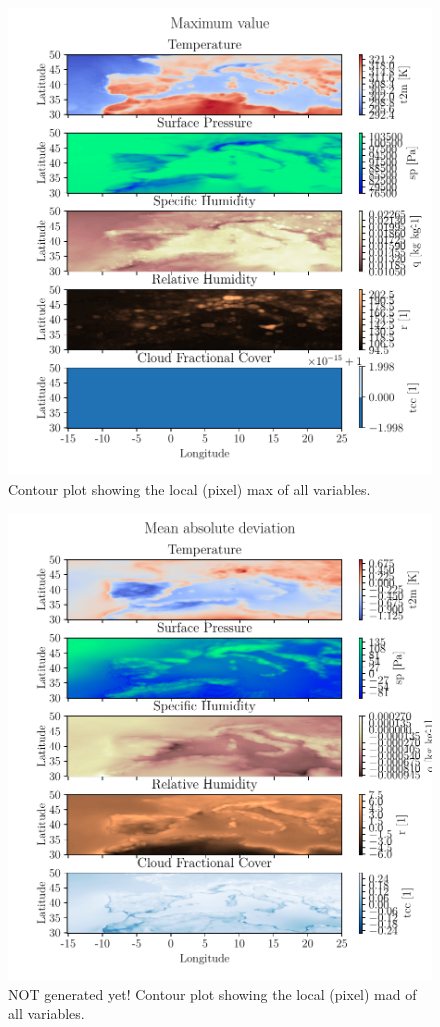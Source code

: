 \begin{figure}[ht]
    \centering
    \includegraphics{python_figs/contourplot_all_variables_max.pdf}
    \caption{Contour plot showing the local (pixel) max of all variables.}
    \label{fig:contour_max_all_vars}
\end{figure}


\begin{figure}[ht]
    \centering
    \includegraphics{python_figs/contourplot_all_variables_mad.pdf}
    \caption{NOT generated yet! Contour plot showing the local (pixel) mad of all variables.}
    \label{fig:contour_mad_all_vars}
\end{figure}


